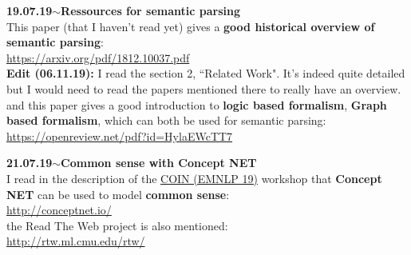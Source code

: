 \documentclass[11pt,a4paper]{article}
\newenvironment{loggentry}[2]%
{\noindent\textbf{#1}\hspace{1cm}$\mathbf{\sim}$\text{ }\textbf{#2}\\}{\vspace{0.5cm}}
\begin{document}
\begin{loggentry}{19.07.19}{Ressources for semantic parsing}

This paper (that I haven't read yet) gives a \textbf{good historical overview of semantic parsing}:\\
\url{https://arxiv.org/pdf/1812.10037.pdf}\\
\textbf{Edit (06.11.19):} I read the section 2, ``Related Work". It's indeed quite detailed but I would need to read the papers mentioned there to really have an overview.
and this paper gives a good introduction to \textbf{logic based formalism}, \textbf{Graph based formalism}, which can both be used for semantic parsing:\\
\url{https://openreview.net/pdf?id=HylaEWcTT7}\\

\end{loggentry}


\begin{loggentry}{21.07.19}{Common sense with Concept NET}

I read in the description of the \href{https://coinnlp.github.io/}{COIN (EMNLP 19)} workshop that \textbf{Concept NET} can be used to model \textbf{common sense}:\\
\url{http://conceptnet.io/}\\
the Read The Web project is also mentioned:\\
\url{http://rtw.ml.cmu.edu/rtw/}

\end{loggentry}
\end{document}
